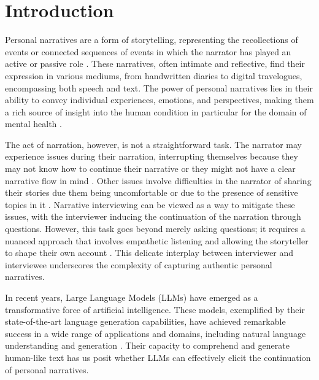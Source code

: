 \chapter{Introduction}
\label{cha:intro}
Personal narratives are a form of storytelling, representing the recollections of events or connected sequences of events in which the narrator has played an active or passive role \cite{tammewarannotation}. These narratives, often intimate and reflective, find their expression in various mediums, from handwritten diaries to digital travelogues, encompassing both speech and text. The power of personal narratives lies in their ability to convey individual experiences, emotions, and perspectives, making them a rich source of insight into the human condition \cite{noauthor-undated-sy, doi:10.1080/1361332032000044567, Bailey2002-fw} in particular for the domain of mental health \cite{Nurser2018-id}. %

The act of narration, however, is not a straightforward task. The narrator may experience issues during their narration, interrupting themselves because they may not know how to continue their narrative or they might not have a clear narrative flow in mind \cite{ong2019modeling}. Other issues involve difficulties in the narrator of sharing their stories due them being uncomfortable or due to the presence of sensitive topics in it \cite{Sammantha2021-na}. Narrative interviewing can be viewed as a way to mitigate these issues, with the interviewer inducing the continuation of the narration through questions. However, this task goes beyond merely asking questions; it requires a nuanced approach that involves empathetic listening and allowing the storyteller to shape their own account \cite{Kim2015-es}. This delicate interplay between interviewer and interviewee underscores the complexity of capturing authentic personal narratives.

In recent years, Large Language Models (LLMs) have emerged as a transformative force of artificial intelligence. These models, exemplified by their state-of-the-art language generation capabilities, have achieved remarkable success in a wide range of applications and domains, including natural language understanding and generation \cite{openai2023gpt4, touvronllama, brown2020language}. Their capacity to comprehend and generate human-like text \cite{schramowski2022large} has us posit whether LLMs can effectively elicit the continuation of personal narratives.

